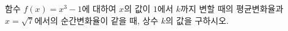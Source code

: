 함수 $f(x)=x^3-1$에 대하여 $x$의 값이 $1$에서 $k$까지 변할 때의 평균변화율과 $x=\sqrt{7}$에서의 순간변화율이 같을 때, 상수 $k$의 값을 구하시오. 
